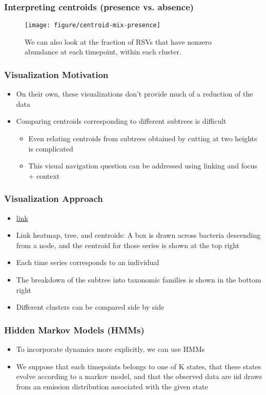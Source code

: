 \documentclass{beamer}
\begin{document}
\begin{frame}
  \frametitle{Interpreting centroids (presence vs. absence)}
\begin{figure}[ht]
  \centering
  \texttt{[image: figure/centroid-mix-presence]}
  \caption{We can also look at the fraction of RSVs that have nonzero abundance
    at each timepoint, within each cluster. \label{fig:centroid-mix-presence} }
\end{figure}
\end{frame}

\begin{frame}
  \frametitle{Visualization Motivation}
  \begin{itemize}
  \item On their own, these visualizations don't provide much of a reduction of the data
  \item Comparing centroids corresponding to different subtrees is difficult
    \begin{itemize}
    \item Even relating centroids from subtrees obtained by cutting at two heights is complicated
    \item This visual navigation question can be addressed using linking and focus + context
    \end{itemize}
  \end{itemize}
\end{frame}

\begin{frame}
  \frametitle{Visualization Approach}
  \begin{itemize}
  \item \href{/Users/krissankaran/Desktop/100_days/july3/hclust.html}{link}
  \item Link heatmap, tree, and centroids: A box is drawn across bacteria descending from a node, and the centroid for those series is shown at the top right
  \item Each time series corresponds to an individual
  \item The breakdown of the subtree into taxonomic families is shown in the bottom right
  \item Different clusters can be compared side by side
  \end{itemize} 
\end{frame}

\begin{frame}
  \frametitle{Hidden Markov Models (HMMs)}
  \begin{itemize}
  \item To incorporate dynamics more explicitly, we can use HMMs
  \item We suppose that each timepoints belongs to one of K states, that these
    states evolve according to a markov model, and that the observed data are iid
    draws from an emission distribution associated with the given state
  \end{itemize}
\end{frame}
\end{document}

